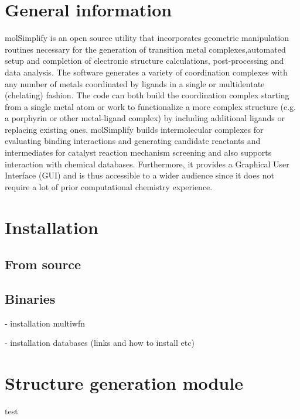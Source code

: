 \documentclass[a4paper,12pt]{assignment}
\begin{document}
\maketitle

\tableofcontents

\clearpage


\section{General information}

molSimplify is an open source utility that incorporates geometric manipulation routines necessary for the generation of transition metal complexes,automated setup and completion of electronic structure calculations, post-processing and data analysis. The software generates a variety of coordination complexes with any number of metals coordinated by ligands in a single or multidentate (chelating) fashion. The code can both build the coordination complex starting from a single metal atom or work to functionalize a more complex structure (e.g. a porphyrin or other metal-ligand complex) by including additional ligands or replacing existing ones. molSimplify builds intermolecular complexes for evaluating binding interactions and generating candidate reactants and intermediates for catalyst reaction mechanism screening and also supports interaction with chemical databases. Furthermore, it provides a Graphical User Interface (GUI) and is thus accessible to a wider audience since it does not require a lot of prior computational chemistry experience.

\section{Installation}


\subsection{From source}

\subsection{Binaries}


- installation multiwfn

- installation databases (links and how to install etc)


\section{Structure generation module}
test
\end{document}
